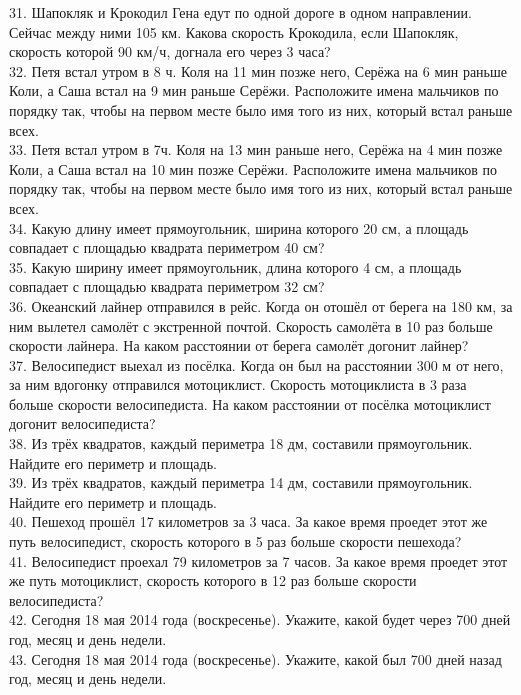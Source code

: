 31. Шапокляк и Крокодил Гена едут по одной дороге в одном направлении. Сейчас между ними 105 км. Какова скорость Крокодила, если Шапокляк, скорость которой 90 км/ч, догнала его через 3 часа?\\
32. Петя встал утром в 8 ч. Коля на 11 мин позже него, Серёжа на 6 мин раньше Коли, а Саша встал на 9 мин раньше Серёжи. Расположите имена мальчиков по порядку так, чтобы на первом месте было имя того из них, который встал раньше всех.\\
33. Петя встал утром в 7ч. Коля на 13 мин раньше него, Серёжа на 4 мин позже Коли, а Саша встал на 10 мин позже Серёжи. Расположите имена мальчиков по порядку так, чтобы на первом месте было имя того из них, который встал раньше всех.\\
34. Какую длину имеет прямоугольник, ширина которого 20 см, а площадь совпадает с площадью квадрата периметром 40 см?\\
35. Какую ширину имеет прямоугольник, длина которого 4 см, а площадь совпадает с площадью квадрата периметром 32 см?\\
36. Океанский лайнер отправился в рейс. Когда он отошёл от берега на 180 км, за ним вылетел самолёт с экстренной почтой. Скорость самолёта в 10 раз больше скорости лайнера. На каком расстоянии от берега самолёт догонит лайнер?\\
37. Велосипедист выехал из посёлка. Когда он был на расстоянии 300 м от него, за ним вдогонку отправился мотоциклист. Скорость мотоциклиста в 3 раза больше скорости велосипедиста. На каком расстоянии от посёлка мотоциклист догонит велосипедиста?\\
38. Из трёх квадратов, каждый периметра 18 дм, составили прямоугольник. Найдите его периметр и площадь.\\
39. Из трёх квадратов, каждый периметра 14 дм, составили прямоугольник. Найдите его периметр и площадь.\\
40. Пешеход прошёл 17 километров за 3 часа. За какое время проедет этот же путь велосипедист, скорость которого в 5 раз больше скорости пешехода?\\
41. Велосипедист проехал 79 километров за 7 часов. За какое время проедет этот же путь мотоциклист, скорость которого в 12 раз больше скорости велосипедиста?\\
42. Сегодня 18 мая 2014 года (воскресенье). Укажите, какой будет через 700 дней год, месяц и день недели.\\
43. Сегодня 18 мая 2014 года (воскресенье). Укажите, какой был 700 дней назад год, месяц и день недели.\\
